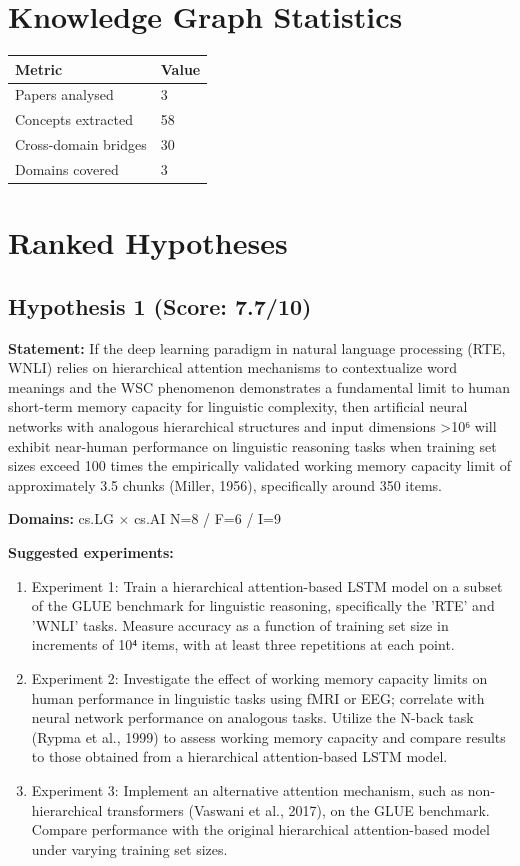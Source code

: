 \documentclass[12pt,a4paper]{article}
\begin{document}
\section{Knowledge Graph Statistics}

\begin{tabular}{ll}
\toprule
Metric & Value \\
\midrule
Papers analysed   & 3 \\
Concepts extracted & 58 \\
Cross-domain bridges & 30 \\
Domains covered   & 3 \\
\bottomrule
\end{tabular}

\section{Ranked Hypotheses}

\subsection*{Hypothesis 1 (Score: 7.7/10)}

\textbf{Statement:} If the deep learning paradigm in natural language processing (RTE, WNLI) relies on hierarchical attention mechanisms to contextualize word meanings and the WSC phenomenon demonstrates a fundamental limit to human short-term memory capacity for linguistic complexity, then artificial neural networks with analogous hierarchical structures and input dimensions >10⁶ will exhibit near-human performance on linguistic reasoning tasks when training set sizes exceed 100 times the empirically validated working memory capacity limit of approximately 3.5 chunks (Miller, 1956), specifically around 350 items.

\noindent\textbf{Domains:} cs.LG $\times$ cs.AI
\hspace{1em} N=8 / F=6 / I=9

\textbf{Suggested experiments:}
\begin{enumerate}
  \item Experiment 1: Train a hierarchical attention-based LSTM model on a subset of the GLUE benchmark for linguistic reasoning, specifically the 'RTE' and 'WNLI' tasks. Measure accuracy as a function of training set size in increments of 10⁴ items, with at least three repetitions at each point.
  \item Experiment 2: Investigate the effect of working memory capacity limits on human performance in linguistic tasks using fMRI or EEG; correlate with neural network performance on analogous tasks. Utilize the N-back task (Rypma et al., 1999) to assess working memory capacity and compare results to those obtained from a hierarchical attention-based LSTM model.
  \item Experiment 3: Implement an alternative attention mechanism, such as non-hierarchical transformers (Vaswani et al., 2017), on the GLUE benchmark. Compare performance with the original hierarchical attention-based model under varying training set sizes.
\end{enumerate}
\end{document}
